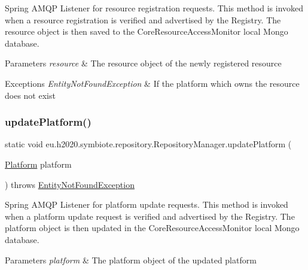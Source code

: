 Spring A\+M\+QP Listener for resource registration requests. This method is invoked when a resource registration is verified and advertised by the Registry. The resource object is then saved to the Core\+Resource\+Access\+Monitor local Mongo database.


\begin{DoxyParams}{Parameters}
{\em resource} & The resource object of the newly registered resource \\
\hline
\end{DoxyParams}

\begin{DoxyExceptions}{Exceptions}
{\em Entity\+Not\+Found\+Exception} & If the platform which owns the resource does not exist \\
\hline
\end{DoxyExceptions}
\mbox{\label{classeu_1_1h2020_1_1symbiote_1_1repository_1_1RepositoryManager_ab40bbdbdd46c6db2eaa59a615c38cfd0}} 
\subsubsection{\texorpdfstring{update\+Platform()}{updatePlatform()}}
{\footnotesize\ttfamily static void eu.\+h2020.\+symbiote.\+repository.\+Repository\+Manager.\+update\+Platform (\begin{DoxyParamCaption}\item[{\hyperlink{classeu_1_1h2020_1_1symbiote_1_1model_1_1Platform}{Platform}}]{platform }\end{DoxyParamCaption}) throws \hyperlink{classeu_1_1h2020_1_1symbiote_1_1exception_1_1EntityNotFoundException}{Entity\+Not\+Found\+Exception}\hspace{0.3cm}{\ttfamily [static]}}

Spring A\+M\+QP Listener for platform update requests. This method is invoked when a platform update request is verified and advertised by the Registry. The platform object is then updated in the Core\+Resource\+Access\+Monitor local Mongo database.


\begin{DoxyParams}{Parameters}
{\em platform} & The platform object of the updated platform \\
\hline
\end{DoxyParams}

